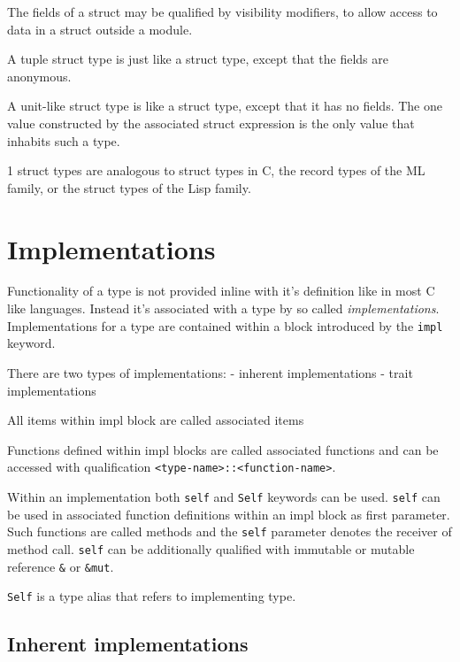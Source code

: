 The fields of a struct may be qualified by visibility modifiers, to allow access to data in a struct outside a module.

A tuple struct type is just like a struct type, except that the fields are anonymous.

A unit-like struct type is like a struct type, except that it has no fields. The one value constructed by the associated struct expression is the only value that inhabits such a type.

1 struct types are analogous to struct types in C, the record types of the ML family, or the struct types of the Lisp family.

\section{Implementations}


Functionality of a type is not provided inline with it's definition like in most C like languages. 
Instead it's associated with a type by so called \textit{implementations}.
Implementations for a type are contained within a block introduced by the \texttt{impl} keyword.

There are two types of implementations:
- inherent implementations
- trait implementations

All items within impl block are called associated items

Functions defined within impl blocks are called associated functions and can be accessed with qualification \texttt{<type-name>::<function-name>}.

Within an implementation both \texttt{self} and \texttt{Self} keywords can be used.
\texttt{self} can be used in associated function definitions within an impl block as first parameter. 
Such functions are called methods and the \texttt{self} parameter denotes the receiver of method call. 
\texttt{self} can be additionally qualified with immutable or mutable reference \texttt{\&} or \texttt{\&mut}.

\texttt{Self} is a type alias that refers to implementing type.


\subsection{Inherent implementations}

